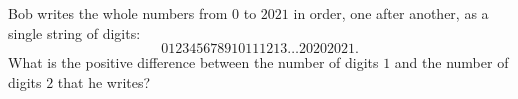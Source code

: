 Bob writes the whole numbers from $0$ to $2021$ in order, one after another, as a single string of digits:
\[012345678910111213\ldots20202021.\]
What is the positive difference between the number of digits $1$ and the number of digits $2$ that he writes?
